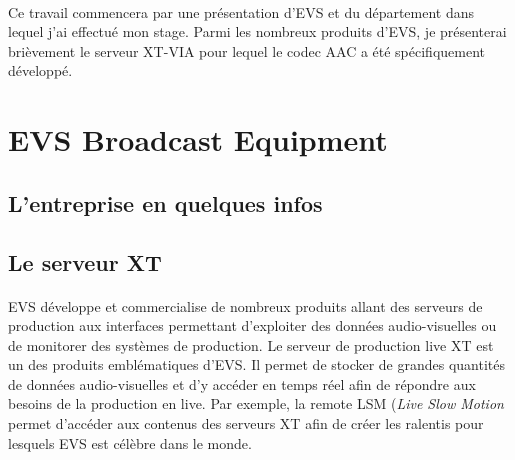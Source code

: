 \documentclass{article}
\begin{document}
    \paragraph{}


    \paragraph{}


    Ce travail commencera par une présentation d'EVS et du département dans lequel j'ai effectué mon stage. Parmi les nombreux produits d'EVS, je présenterai brièvement le serveur XT-VIA pour lequel le codec AAC a été spécifiquement développé.




    \section{EVS Broadcast Equipment}
    \subsection{L'entreprise en quelques infos}




    \subsection{Le serveur XT}
    \paragraph{}
    EVS développe et commercialise de nombreux produits allant des serveurs de production aux interfaces permettant d'exploiter des données audio-visuelles ou de monitorer des systèmes de production\cite{EVS:products}. Le serveur de production live XT est un des produits emblématiques d'EVS. Il permet de stocker de grandes quantités de données audio-visuelles et d'y accéder en temps réel afin de répondre aux besoins de la production en live. Par exemple, la remote LSM (\emph{Live Slow Motion} permet d'accéder aux contenus des serveurs XT afin de créer les ralentis pour lesquels EVS est célèbre dans le monde.
\end{document}
